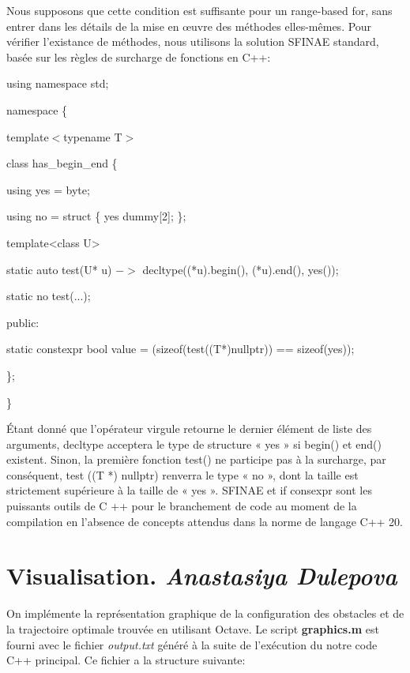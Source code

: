 \documentclass[12pt]{article}
\begin{document}
	Nous supposons que cette condition est suffisante pour un range-based for, sans entrer dans les détails de la mise en œuvre des méthodes elles-mêmes. Pour vérifier l'existance de méthodes, nous utilisons la solution SFINAE standard, basée sur les règles de surcharge de fonctions en C++:
	
	{
		\selectfont
		\setlength{\parindent}{2em}
		using namespace std;
		
		namespace \{
		
		template$<$typename T$>$
		
		class has\_begin\_end \{
		
		\setlength{\parindent}{4em}
		using yes = byte;
		
		using no = struct \{ yes dummy[2]; \};
		
		template<class U>
		
		static auto test(U* u) $->$ decltype((*u).begin(), (*u).end(), yes());
		
		static no   test(...);
		
		\setlength{\parindent}{2em}	
		public:
		
		\setlength{\parindent}{4em}
		static constexpr bool value =
		(sizeof(test((T*)nullptr)) == sizeof(yes));
		
		\setlength{\parindent}{2em}
		\};
		
		\}
	}
	
	Étant donné que l'opérateur virgule retourne le dernier élément de liste des arguments, decltype acceptera le type de structure « yes » si begin() et end() existent. Sinon, la première fonction test() ne participe pas à la surcharge, par conséquent, test ((T *) nullptr) renverra le type « no », dont la taille est strictement supérieure à la taille de « yes ». SFINAE et if consexpr sont les puissants outils de C ++ pour le branchement de code au moment de la compilation en l'absence de concepts attendus dans la norme de langage C++ 20.
	
	\section{Visualisation. \textit{Anastasiya Dulepova}}
	On implémente la représentation graphique de la configuration des obstacles et de la trajectoire optimale trouvée en utilisant Octave. Le script \textbf{graphics.m} est fourni avec le fichier \textit{output.txt} généré à la suite de l'exécution du notre code C++ principal. Ce fichier a la structure suivante:
	
\end{document}
